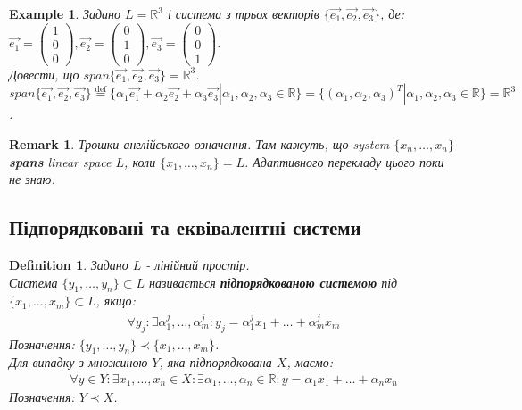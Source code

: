 \documentclass[a4paper, 10pt]{article}
\theoremstyle{theoremdd}
\theoremstyle{theoremdd}
\newtheorem{definition}[theorem]{Definition}
\theoremstyle{theoremdd}
\theoremstyle{theoremdd}
\newtheorem{example}[theorem]{Example}
\theoremstyle{theoremdd}
\theoremstyle{theoremdd}
\newtheorem{remark}[theorem]{Remark}
\theoremstyle{theoremdd}
\theoremstyle{theoremdd}
\begin{document}
	\begin{example}
	Задано $L = \mathbb{R}^3$ і система з трьох векторів $\{\vec{e_1},\vec{e_2},\vec{e_3}\}$, де:\\
	$\vec{e_1} =\begin{pmatrix} 1\\ 0\\ 0 \end{pmatrix}, \vec{e_2} =\begin{pmatrix} 0\\ 1\\ 0 \end{pmatrix}, \vec{e_3} =\begin{pmatrix} 0\\ 0\\ 1 \end{pmatrix}$.\\
	Довести, що $span\{\vec{e_1}, \vec{e_2}, \vec{e_3}\} = \mathbb{R}^3$.\\
	$span\{\vec{e_1}, \vec{e_2}, \vec{e_3}\} \overset{\textrm{def}}{=} \{\alpha_1 \vec{e_1} + \alpha_2 \vec{e_2} + \alpha_3 \vec{e_3} | \alpha_1, \alpha_2, \alpha_3 \in \mathbb{R}\} = \{(\alpha_1, \alpha_2, \alpha_3)^T | \alpha_1, \alpha_2, \alpha_3 \in \mathbb{R}\} = \mathbb{R}^3$.
	\end{example}
	
	\begin{remark}
	Трошки англійського означення. Там кажуть, що system $\{ x_n,\dots,x_n \}$ \textbf{spans} linear space $L$, коли $\{x_1,\dots,x_n\} = L$. Адаптивного перекладу цього поки не знаю.
	\end{remark}

		
	\subsection{Підпорядковані та еквівалентні системи}
	\begin{definition}
	Задано $L$ - лінійний простір.\\
	Система $\{y_1, \dots, y_n \} \subset L$ називається \textbf{підпорядкованою системою} під $\{x_1, \dots, x_m\} \subset L$, якщо:
	\begin{align*}
	\forall y_j: \exists \alpha^j_1, \dots, \alpha^j_m: y_j = \alpha^j_1 x_1 + \dots + \alpha^j_m x_m
	\end{align*}
	Позначення: $\{y_1, \dots, y_n \} \prec \{x_1, \dots, x_m \}$.\\
	Для випадку з множиною $Y$, яка підпорядкована $X$, маємо:
	\begin{align*}
	\forall y \in Y: \exists x_1,\dots,x_n \in X: \exists \alpha_1, \dots, \alpha_n \in \mathbb{R}: y = \alpha_1 x_1 + \dots + \alpha_n x_n
	\end{align*}
	Позначення: $Y \prec X$.
	\end{definition}
	
\end{document}
